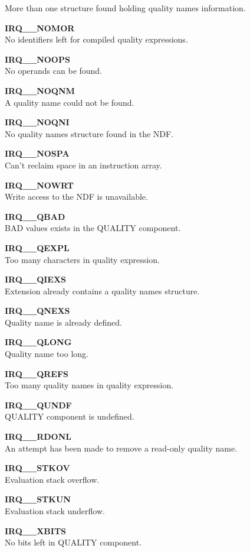 \begin{description}
More than one structure found holding quality names information.
\item {\bf IRQ\_\_NOMOR}\\
No identifiers left for compiled quality expressions.
\item {\bf IRQ\_\_NOOPS}\\ 
No operands can be found.
\item {\bf IRQ\_\_NOQNM}\\ 
A quality name could not be found.
\item {\bf IRQ\_\_NOQNI}\\ 
No quality names structure found in the NDF.
\item {\bf IRQ\_\_NOSPA}\\ 
Can't reclaim space in an instruction array.
\item {\bf IRQ\_\_NOWRT}\\ 
Write access to the NDF is unavailable.
\item {\bf IRQ\_\_QBAD }\\ 
BAD values exists in the QUALITY component.
\item {\bf IRQ\_\_QEXPL}\\ 
Too many characters in quality expression.
\item {\bf IRQ\_\_QIEXS}\\ 
Extension already contains a quality names structure.
\item {\bf IRQ\_\_QNEXS}\\ 
Quality name is already defined.
\item {\bf IRQ\_\_QLONG}\\ 
Quality name too long.
\item {\bf IRQ\_\_QREFS}\\ 
Too many quality names in quality expression.
\item {\bf IRQ\_\_QUNDF}\\ 
QUALITY component is undefined.
\item {\bf IRQ\_\_RDONL}\\ 
An attempt has been made to remove a read-only quality name.
\item {\bf IRQ\_\_STKOV}\\ 
Evaluation stack overflow.
\item {\bf IRQ\_\_STKUN}\\ 
Evaluation stack underflow.
\item {\bf IRQ\_\_XBITS}\\ 
No bits left in QUALITY component.
\end{description}

